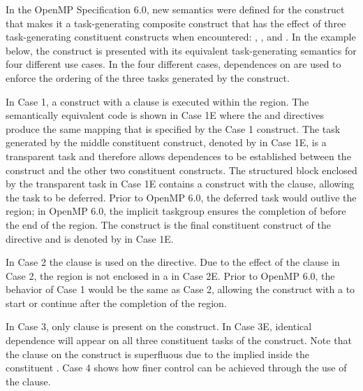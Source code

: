 In the OpenMP Specification 6.0, new semantics were defined for the  construct that 
makes it a task-generating composite construct that has the effect of three task-generating 
constituent constructs when encountered: , , and 
.
In the example below, the  construct is presented with its equivalent 
task-generating semantics for four different use cases.
In the four different cases, dependences on  are used to enforce the ordering of 
the three tasks generated by the  construct.

In Case 1, a  construct with a  clause is executed within 
the  region. 
The semantically equivalent code is shown in Case 1E 
where the  and  directives produce 
the same mapping that is specified by the Case 1  construct.
The task generated by the middle constituent construct, denoted by  in Case 1E, 
is a transparent task and therefore allows dependences to be established between the 
 construct and the other two constituent constructs.
The structured block enclosed by the transparent task in Case 1E contains a  construct 
with the  clause, allowing the task  to be deferred. 
Prior to OpenMP 6.0, the deferred task  would outlive the  region;
in OpenMP 6.0, the implicit taskgroup ensures the completion of  before
the end of the  region.
The  construct is the final constituent construct of the  
directive and is denoted by  in Case 1E.  

In Case 2 the  clause is used on the  directive.
Due to the effect of the  clause in Case 2, the  region is not enclosed in 
a  in Case 2E. 
Prior to OpenMP 6.0, the behavior of Case 1 would be the same as Case 2, 
allowing the  construct with a  to start or continue after the completion of the 
 region.

In Case 3, only  clause is present on the  construct. 
In Case 3E, identical dependence will appear on all three constituent tasks of the  
construct.
Note that the  clause on the  construct is superfluous 
due to the implied  inside the constituent . Case 4 shows 
how finer control can be achieved through the use of the  clause.

